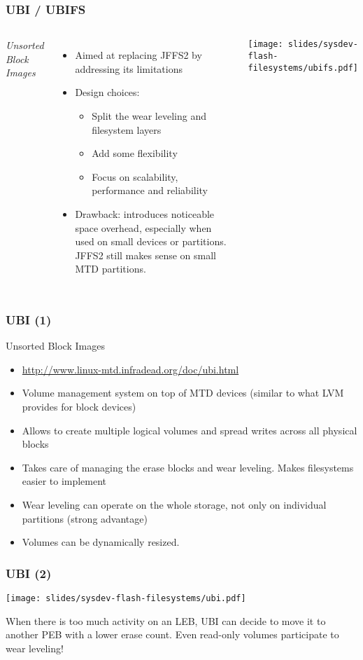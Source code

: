 \begin{frame}
  \frametitle{UBI / UBIFS}
  \begin{columns}
    {\em Unsorted Block Images}
    \begin{itemize}
    \item Aimed at replacing JFFS2 by addressing its limitations
    \item Design choices:
      \begin{itemize}
      \item Split the wear leveling and filesystem layers
      \item Add some flexibility
      \item Focus on scalability, performance and reliability
      \end{itemize}
    \item Drawback: introduces noticeable space overhead,
      especially when used on small devices or partitions. JFFS2
      still makes sense on small MTD partitions.
    \end{itemize}
    \texttt{[image: slides/sysdev-flash-filesystems/ubifs.pdf]}
  \end{columns}
\end{frame}

\begin{frame}
  \frametitle{UBI (1)}
  Unsorted Block Images
  \begin{itemize}
  \item \url{http://www.linux-mtd.infradead.org/doc/ubi.html}
  \item Volume management system on top of MTD devices (similar to
    what LVM provides for block devices)
  \item Allows to create multiple logical volumes and spread writes
    across all physical blocks
  \item Takes care of managing the erase blocks and wear
    leveling. Makes filesystems easier to implement
  \item Wear leveling can operate on the whole storage,
    not only on individual partitions (strong advantage)
  \item Volumes can be dynamically resized.
  \end{itemize}
\end{frame}

\begin{frame}
  \frametitle{UBI (2)}
  \begin{center}
    \texttt{[image: slides/sysdev-flash-filesystems/ubi.pdf]}
  \end{center}
  When there is too much activity on an LEB, UBI can decide to move it
  to another PEB with a lower erase count. Even read-only volumes
  participate to wear leveling!
\end{frame}

